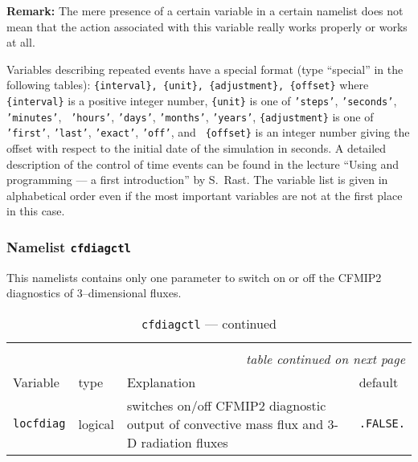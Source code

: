 {\bf Remark:} The mere presence of a certain variable in a certain
namelist does not mean that the action associated with this variable
really works properly or works at all.

Variables describing repeated events have a special format (type
``special'' in the 
following tables): \newline
{\tt \{interval\}, \{unit\}, \{adjustment\}, \{offset\}}\newline
where {\tt \{interval\}} is a positive integer number, {\tt \{unit\}}
is one of {\tt 'steps'}, {\tt 'seconds'}, {\tt 'minutes'}, {\tt
  'hours'}, {\tt 'days'}, {\tt 'months'}, {\tt 'years'}, {\tt \{adjustment\}} is
one of {\tt 'first'}, {\tt 'last'}, {\tt 'exact'}, {\tt 'off'}, and {\tt
  \{offset\}} is an integer number giving the offset with respect to
the initial date of the simulation in seconds. A detailed description
of the control of time events can be found in the 
lecture ``Using and programming \echam{} --- a first introduction''
by S.~Rast. The variable list is given in
alphabetical order even if the most important variables are not at the
first place in this case.

\subsubsection{Namelist {\tt cfdiagctl}}\label{seccfdiagctl}

This namelists contains only one parameter to switch on or off the
CFMIP2 diagnostics of 3--dimensional fluxes.

\setlength{\LTcapwidth}{\textwidth}
\setlength{\LTleft}{0pt}\setlength{\LTright}{0pt}

\begin{longtable}{l@{\extracolsep\fill}lp{5.0cm}p{3.0cm}}
\hline\hline\caption[Namelist {\tt cfdiagctl}]{Namelist
  {\tt cfdiagctl}}\\\hline\label{tabcfdiagctl}
\endfirsthead
\caption[]{{\tt cfdiagctl} --- continued}\\\hline
\endhead
\hline\multicolumn{4}{r}{\slshape table continued on next page}\\
\endfoot
\hline %
\endlastfoot
Variable & type & Explanation & default \\\hline
{\tt locfdiag}\index{namelist variables!locfdiag} & logical & switches on/off CFMIP2 diagnostic output of
convective mass flux and 3-D radiation fluxes & {\tt .FALSE.} \\\hline
\end{longtable}
